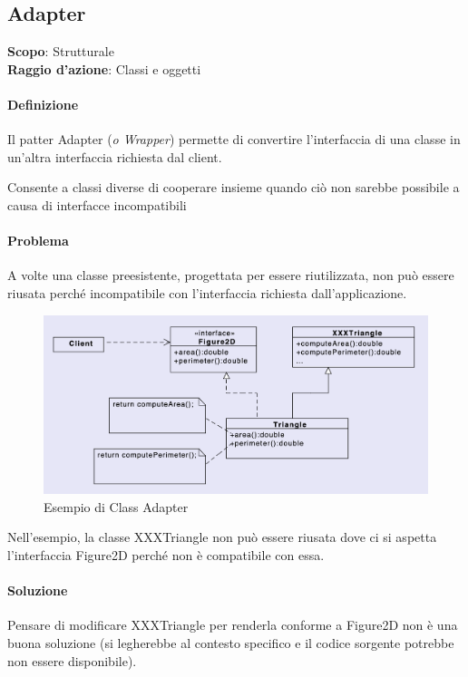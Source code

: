 \subsection{Adapter}


\textbf{Scopo}: Strutturale \\
\textbf{Raggio d'azione}: Classi e oggetti

\paragraph{Definizione}
Il patter Adapter (\textit{o Wrapper}) permette di convertire l'interfaccia di una classe in un'altra interfaccia richiesta dal client.

Consente a classi diverse di cooperare insieme quando ciò non sarebbe possibile a causa di interfacce incompatibili

\paragraph{Problema} A volte una classe preesistente, progettata per essere riutilizzata, non può essere riusata perché incompatibile con l'interfaccia richiesta dall'applicazione.

\begin{figure}[H]
    \centering
    \includegraphics[width=0.75\linewidth]{assets/pattern/adapter/class-adapter.png}
    \caption{Esempio di Class Adapter}
\end{figure}

Nell’esempio, la classe XXXTriangle non può essere riusata dove ci si aspetta l’interfaccia Figure2D perché non è compatibile con essa.

\paragraph{Soluzione} Pensare di modificare XXXTriangle per renderla conforme a Figure2D non è una buona soluzione (si legherebbe al contesto specifico e il codice sorgente potrebbe non essere disponibile).

